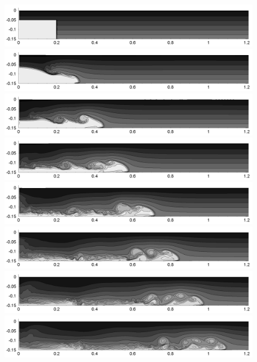 \begin{figure}[htbp]
  \begin{center}    \includegraphics[scale=0.55]{../figures/colocated/Fig9case/560-240-00375-VE-6-Surf0/01.png}    \includegraphics[scale=0.55]{../figures/colocated/Fig9case/560-240-00375-VE-6-Surf0/02.png}
\includegraphics[scale=0.55]{../figures/colocated/Fig9case/560-240-00375-VE-6-Surf0/03.png}
\includegraphics[scale=0.55]{../figures/colocated/Fig9case/560-240-00375-VE-6-Surf0/04.png}    \includegraphics[scale=0.55]{../figures/colocated/Fig9case/560-240-00375-VE-6-Surf0/05.png}
\includegraphics[scale=0.55]{../figures/colocated/Fig9case/560-240-00375-VE-6-Surf0/06.png}
\includegraphics[scale=0.55]{../figures/colocated/Fig9case/560-240-00375-VE-6-Surf0/07.png}    \includegraphics[scale=0.55]{../figures/colocated/Fig9case/560-240-00375-VE-6-Surf0/08.png}

\end{center}
\end{figure}
